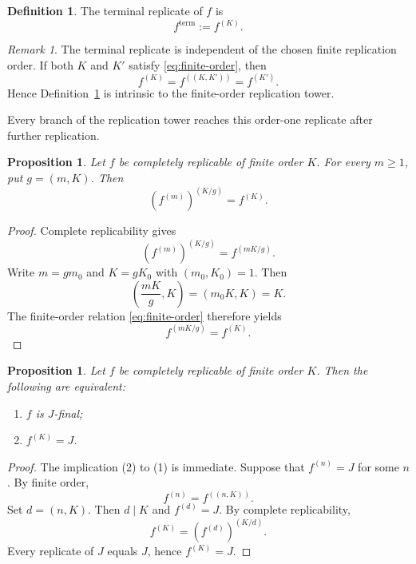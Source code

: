 \documentclass[12pt]{amsart}
\newtheorem{prop}[thm]{Proposition}
\theoremstyle{definition}
\newtheorem{defn}[thm]{Definition}
\theoremstyle{remark}
\newtheorem{remark}[thm]{Remark}
\numberwithin{equation}{section}
\begin{document}
\begin{defn}\label{def:terminal}
The terminal replicate of $f$ is
\[
f^{\mathrm{term}}:=f^{(K)}.
\]
\end{defn}

\begin{remark}\label{rem:terminal-independent}
The terminal replicate is independent of the chosen finite replication order. If both $K$ and $K'$ satisfy \eqref{eq:finite-order}, then
\[
f^{(K)}=f^{((K,K'))}=f^{(K')}.
\]
Hence Definition~\ref{def:terminal} is intrinsic to the finite-order replication tower.
\end{remark}

Every branch of the replication tower reaches this order-one replicate after further replication.

\begin{prop}\label{prop:common-terminal}
Let $f$ be completely replicable of finite order $K$. For every $m\geq1$, put $g=(m,K)$. Then
\begin{equation}\label{eq:common-terminal}
\left(f^{(m)}\right)^{(K/g)}=f^{(K)}.
\end{equation}
\end{prop}

\begin{proof}
Complete replicability gives
\[
\left(f^{(m)}\right)^{(K/g)}
=f^{(mK/g)}.
\]
Write $m=gm_0$ and $K=gK_0$ with $(m_0,K_0)=1$. Then
\[
\left(\frac{mK}{g},K\right)
=(m_0K,K)=K.
\]
The finite-order relation \eqref{eq:finite-order} therefore yields
\[
f^{(mK/g)}=f^{(K)}.
\]
\end{proof}

\begin{prop}\label{prop:J-terminal-equivalence}
Let $f$ be completely replicable of finite order $K$. Then the following are equivalent:
\begin{enumerate}
\item $f$ is $J$-final;
\item $f^{(K)}=J$.
\end{enumerate}
\end{prop}

\begin{proof}
The implication (2) to (1) is immediate. Suppose that $f^{(n)}=J$ for some $n$. By finite order,
\[
f^{(n)}=f^{((n,K))}.
\]
Set $d=(n,K)$. Then $d\mid K$ and $f^{(d)}=J$. By complete replicability,
\[
f^{(K)}
=\left(f^{(d)}\right)^{(K/d)}.
\]
Every replicate of $J$ equals $J$, hence $f^{(K)}=J$.
\end{proof}
\end{document}
